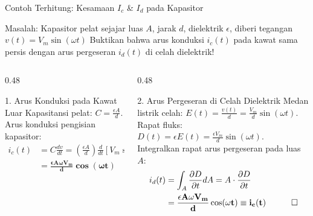 \documentclass[aspectratio=169,10pt]{beamer}
\begin{document}
\begin{frame}{Contoh Terhitung: Kesamaan $I_c$ \& $I_d$ pada Kapasitor}
  \begin{exampleblock}{Masalah: Kapasitor pelat sejajar luas $A$, jarak $d$, dielektrik $\epsilon$, diberi tegangan $v(t) = V_m \sin(\omega t)$}
    Buktikan bahwa arus konduksi $i_c(t)$ pada kawat sama persis dengan arus pergeseran $i_d(t)$ di celah dielektrik!
  \end{exampleblock}
  \vspace{-0.05cm}
  \begin{columns}[t]
    \begin{column}{0.48\textwidth}
      \begin{block}{1. Arus Konduksi pada Kawat Luar}
        \small
        Kapasitansi pelat: $C = \frac{\epsilon A}{d}$.\\
        Arus konduksi pengisian kapasitor:
        \begin{align*}
          i_c(t) &= C \frac{dv}{dt} = \left(\frac{\epsilon A}{d}\right) \frac{d}{dt}\left[V_m \sin(\omega t)\right] \\
          &= \mathbf{\frac{\epsilon A \omega V_m}{d} \cos(\omega t)}
        \end{align*}
      \end{block}
    \end{column}
    \begin{column}{0.48\textwidth}
      \begin{alertblock}{2. Arus Pergeseran di Celah Dielektrik}
        \small
        Medan listrik celah: $E(t) = \frac{v(t)}{d} = \frac{V_m}{d}\sin(\omega t)$.\\
        Rapat fluks: $D(t) = \epsilon E(t) = \frac{\epsilon V_m}{d}\sin(\omega t)$.\\
        Integralkan rapat arus pergeseran pada luas $A$:
        \begin{align*}
          i_d(t) &= \int_A \frac{\partial D}{\partial t} dA = A \cdot \frac{\partial D}{\partial t} \\
          &= \mathbf{\frac{\epsilon A \omega V_m}{d} \cos(\omega t) \equiv i_c(t)} \quad \qed
        \end{align*}
      \end{alertblock}
    \end{column}
  \end{columns}
\end{frame}
\end{document}
